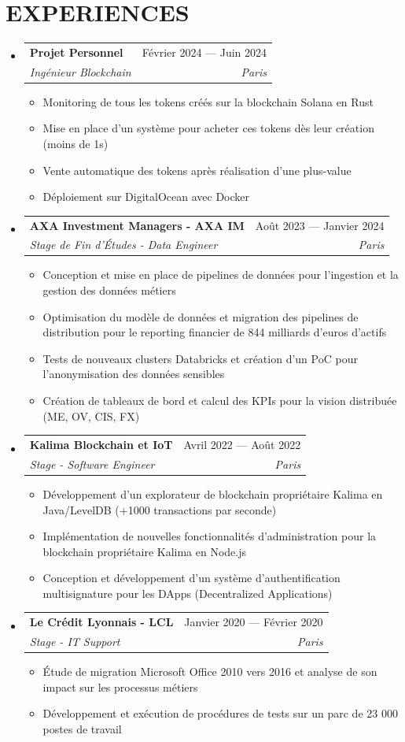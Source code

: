 \documentclass[11pt,a4paper]{article}
\makeatletter
\newcommand{\resumeItem}[1]{
  \item\footnotesize{
    {#1 \vspace{-1pt}}
  }
}
\newcommand{\resumeSubheading}[4]{
  \vspace{2pt}\item
    \begin{tabular*}{\textwidth}[t]{l@{\extracolsep{\fill}}r}
      {\footnotesize\textbf{#1}} & {\footnotesize#2} \\
      {\footnotesize\textit{#3}} & {\footnotesize\textit{#4}} \\
    \end{tabular*}\vspace{2pt}
}
\newcommand{\resumeSubHeadingListStart}{\begin{itemize}[leftmargin=0in, label={}]}
\newcommand{\resumeSubHeadingListEnd}{\end{itemize}}
\newcommand{\resumeItemListStart}{\begin{itemize}[label={\textbullet}]}
\newcommand{\resumeItemListEnd}{\end{itemize}\vspace{0pt}}
\makeatother
\begin{document}
\section{EXPERIENCES}
\resumeSubHeadingListStart
    \resumeSubheading
      {Projet Personnel}{Février 2024 --- Juin 2024}
      {Ingénieur Blockchain}{Paris}
      \resumeItemListStart
        \resumeItem{Monitoring de tous les tokens créés sur la blockchain Solana en Rust}
        \resumeItem{Mise en place d'un système pour acheter ces tokens dès leur création (moins de 1s)}
        \resumeItem{Vente automatique des tokens après réalisation d'une plus-value}
        \resumeItem{Déploiement sur DigitalOcean avec Docker}
      \resumeItemListEnd
    \resumeSubheading
      {AXA Investment Managers - AXA IM}{Août 2023 --- Janvier 2024}
      {Stage de Fin d'Études - Data Engineer}{Paris}
      \resumeItemListStart
        \resumeItem{Conception et mise en place de pipelines de données pour l'ingestion et la gestion des données métiers}
        \resumeItem{Optimisation du modèle de données et migration des pipelines de distribution pour le reporting financier de 844 milliards d'euros d'actifs}
        \resumeItem{Tests de nouveaux clusters Databricks et création d'un PoC pour l'anonymisation des données sensibles}
        \resumeItem{Création de tableaux de bord et calcul des KPIs pour la vision distribuée (ME, OV, CIS, FX)}
      \resumeItemListEnd
    \resumeSubheading
      {Kalima Blockchain et IoT}{Avril 2022 --- Août 2022}
      {Stage - Software Engineer}{Paris}
      \resumeItemListStart
        \resumeItem{Développement d'un explorateur de blockchain propriétaire Kalima en Java/LevelDB (+1000 transactions par seconde)}
        \resumeItem{Implémentation de nouvelles fonctionnalités d'administration pour la blockchain propriétaire Kalima en Node.js}
        \resumeItem{Conception et développement d'un système d'authentification multisignature pour les DApps (Decentralized Applications)}
      \resumeItemListEnd
    \resumeSubheading
      {Le Crédit Lyonnais - LCL}{Janvier 2020 --- Février 2020}
      {Stage - IT Support}{Paris}
      \resumeItemListStart
        \resumeItem{Étude de migration Microsoft Office 2010 vers 2016 et analyse de son impact sur les processus métiers}
        \resumeItem{Développement et exécution de procédures de tests sur un parc de 23 000 postes de travail}
      \resumeItemListEnd
  \resumeSubHeadingListEnd
\end{document}
